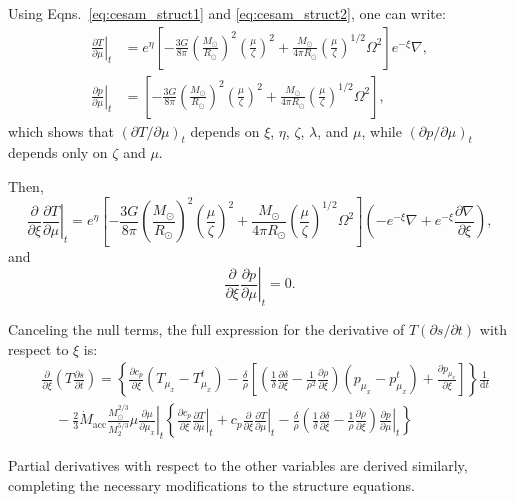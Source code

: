 \documentclass[12pt,a4paper]{article}
\newcommand{\mr}{\mathrm}
\newcommand{\pfird}[2][]{\frac{\partial#1}{\partial#2}}
\newcommand{\dd}[1]{\mathrm{d}#1}
\begin{document}
Using Eqns.~\eqref{eq:cesam_struct1} and \eqref{eq:cesam_struct2}, one can write: 
\begin{align}
  \left.\pfird[T]{\mu}\right|_t &= e^\eta\left[-\frac{3G}{8\pi}\left(\frac{M_\odot}{R_\odot}\right)^2\left(\frac{\mu}{\zeta}\right)^2 + \frac{M_\odot}{4\pi R_\odot}\left(\frac{\mu}{\zeta}\right)^{1/2} \Omega^2\right]e^{-\xi}\nabla,\\
  \left.\pfird[p]{\mu}\right|_t &= \left[-\frac{3G}{8\pi}\left(\frac{M_\odot}{R_\odot}\right)^2\left(\frac{\mu}{\zeta}\right)^2 + \frac{M_\odot}{4\pi R_\odot}\left(\frac{\mu}{\zeta}\right)^{1/2} \Omega^2\right],
\end{align}
which shows that $\left(\partial T/\partial \mu\right)_t$ depends on $\xi$, $\eta$, $\zeta$, $\lambda$, and $\mu$, while $\left(\partial p/\partial \mu\right)_t$ depends only on $\zeta$ and $\mu$.

Then, 
\begin{equation}
  \pfird[]{\xi}\left.\pfird[T]{\mu}\right|_t = e^\eta\left[-\frac{3G}{8\pi}\left(\frac{M_\odot}{R_\odot}\right)^2\left(\frac{\mu}{\zeta}\right)^2 + \frac{M_\odot}{4\pi R_\odot}\left(\frac{\mu}{\zeta}\right)^{1/2} \Omega^2\right]\left(-e^{-\xi}\nabla + e^{-\xi}\pfird[\nabla]{\xi}\right),
\end{equation}
and 
\begin{equation}
  \pfird[]{\xi}\left.\pfird[p]{\mu}\right|_t = 0.
\end{equation}

Canceling the null terms, the full expression for the derivative of $T(\partial s/\partial t)$ with respect to $\xi$ is:
\begin{align}
  &\pfird[]{\xi}\left(T\pfird[s]{t}\right) = \left\{\pfird[c_p]{\xi}\left(T_{\mu_x} - T_{\mu_x}^t\right) - \frac{\delta}{\rho}\left[\left(\frac{1}{\delta}\pfird[\delta]{\xi} - \frac{1}{\rho^2}\pfird[\rho]{\xi}\right)\left(p_{\mu_x} - p_{\mu_x}^t\right)  +\pfird[p_{\mu_x}]{\xi}\right]\right\}\frac{1}{\dd{t}}\\
  &\quad-\frac{2}{3}\dot{M}_\mr{acc}\frac{M_\odot^{2/3}}{M_2^{5/3}}\mu\left.\pfird[\mu]{\mu_x}\right|_t\left\{\pfird[c_p]{\xi}\left.\pfird[T]{\mu}\right|_t + c_p\pfird[]{\xi}\left.\pfird[T]{\mu}\right|_t - \frac{\delta}{\rho}\left(\frac{1}{\delta}\pfird[\delta]{\xi} - \frac{1}{\rho}\pfird[\rho]{\xi}\right)\left.\pfird[p]{\mu}\right|_t\right\}
\end{align}

Partial derivatives with respect to the other variables are derived similarly, completing the necessary modifications to the structure equations.
\end{document}
